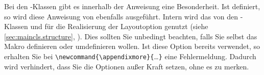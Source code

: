 \begin{Declaration}
\end{Declaration}%
Bei den {\KOMAScript}-Klassen gibt es innerhalb der Anweisung
%
 eine
Besonderheit. Ist  definiert, so wird diese Anweisung von
 ebenfalls ausgeführt. Intern wird das von den
{\KOMAScript}-Klassen  und  für die Realisierung der Layoutoption
 genutzt (siehe
\autoref{sec:maincls.structure},
). Dies  sollten
Sie unbedingt beachten, falls Sie selbst das Makro 
definieren oder umdefinieren wollen. Ist diese Option bereits verwendet, so
erhalten Sie bei \verb|\newcommand{\appendixmore}{|\dots\verb|}| eine
Fehlermeldung.  Dadurch wird verhindert, dass Sie die Optionen außer
Kraft setzen, ohne es zu merken.

